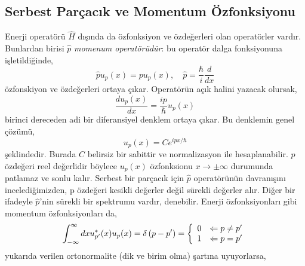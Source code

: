 \documentclass[a4paper,12pt, twoside]{article}
\begin{document}
\subsection{Serbest Parçacık ve Momentum Özfonksiyonu}

Enerji operatörü $\hat H$ dışında da özfonksiyon ve özdeğerleri olan operatörler vardır. Bunlardan birisi $\hat p$ \emph{momenum operatörüdür}: bu operatör dalga fonksiyonuna işletildiğinde,
\begin{equation}
\hat p u _ { p } ( x ) = p u _ { p } ( x ), \quad \hat p = \frac{\hbar}{i} \frac{d}{dx}
\end{equation}
özfonskiyon ve özdeğerleri ortaya çıkar. Operatörün açık halini yazacak olursak,
\begin{equation}
\frac { d u _ { p } ( x ) } { d x } = \frac { i p } { \hbar } u _ { p } ( x )
\end{equation}
birinci dereceden adi bir diferansiyel denklem ortaya çıkar. Bu denklemin genel çözümü,
\begin{equation}
u _ { p } ( x ) = C e ^ { i p x / \hbar }
\end{equation}
şeklindedir. Burada $C$ belirsiz bir sabittir ve normalizasyon ile hesaplanabilir. $p$ özdeğeri reel değerlidir böylece $u_p(x)$ özfonksionu $x \rightarrow \pm \infty$ durumunda patlamaz ve sonlu kalır. Serbest bir parçacık için $\hat p$ operatörünün davranışını incelediğimizden, p özdeğeri kesikli değerler değil sürekli değerler alır. Diğer bir ifadeyle $\hat p$'nin sürekli bir spektrumu vardır, denebilir. Enerji özfonksiyonları gibi momentum özfonksiyonları da,
\begin{equation}
\int _ { - \infty } ^ { \infty } d x u _ { p ^ { \prime } } ^ { * } ( x ) u _ { p } ( x ) = \delta \left( p - p ^ { \prime } \right)
 = \left\{
\begin{array} { c l } 
{ 0 } & { \Leftarrow p \neq p^\prime } \\ 
{ 1 } & { \Leftarrow p   =  p^\prime} 
\end{array} 
\right.
\end{equation}
yukarıda verilen ortonormalite (dik ve birim olma) şartına uyuyorlarsa,
\end{document}
